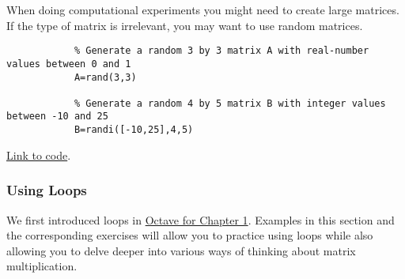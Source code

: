 \documentclass{ximera}
\begin{document}
    \begin{template}\label{temp:randMat}
        When doing computational experiments you might need to create large matrices.  If the type of matrix is irrelevant, you may want to use random matrices.
    
        \begin{verbatim}
            % Generate a random 3 by 3 matrix A with real-number values between 0 and 1
            A=rand(3,3)
            
            % Generate a random 4 by 5 matrix B with integer values between -10 and 25
            B=randi([-10,25],4,5)
        \end{verbatim}
    
    \href{https://sagecell.sagemath.org/?z=eJxtzLEKwjAUheE9kHc4S6GFFGzTjA7t0ocQhxu8aKCJEFNb397U4qTLGX44X4GRA0dKDEKkcLl7aNhXHk8puhU9FpduiExTHWZvOeJJ08wPWE4Lc8AB-YdGiv64CaVWupJCiuKP3W22-drDbruQ-Prr1s0ut0aK4UO78pSjas1ZdcpUb3XOOqE=&lang=octave&interacts=eJyLjgUAARUAuQ==}{Link to code}.    
    \end{template}

    \subsubsection*{Using Loops}

    We first introduced loops in \href{https://ximera.osu.edu/linearalgebradzv3/xOctave/OCT_vectors/main}{Octave for Chapter 1}.  Examples in this section and the corresponding exercises will allow you to practice using loops while also allowing you to delve deeper into various ways of thinking about matrix multiplication. 
\end{document}
